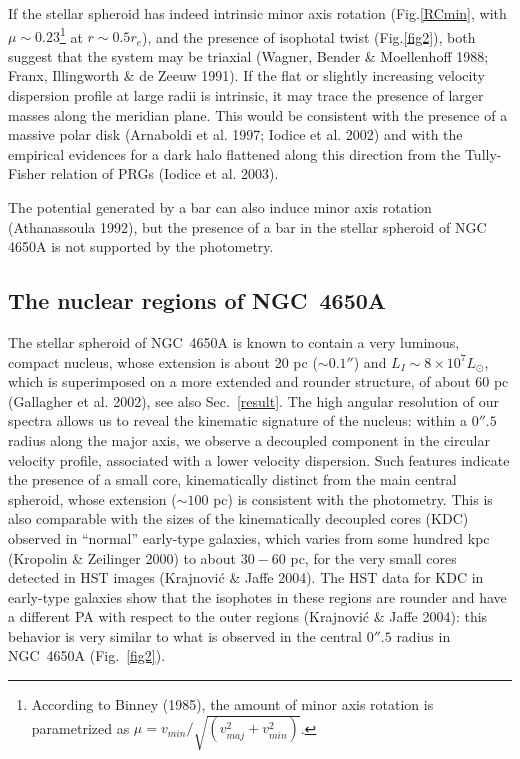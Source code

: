 \documentclass[12pt,preprint]{aastex}
\begin{document}
If the stellar spheroid has indeed intrinsic minor axis rotation
(Fig.\ref{RCmin}, with $\mu \sim 0.23$\footnote{According to Binney
(1985), the amount of minor axis rotation is parametrized as $\mu =
v_{min}/\sqrt{(v_{maj}^{2} +v_{min}^{2})}$.} at $r\sim 0.5 r_e$), and
the presence of isophotal twist (Fig.\ref{fig2}), both suggest that
the system may be triaxial (Wagner, Bender \& Moellenhoff 1988; Franx,
Illingworth \& de Zeeuw 1991). If the flat or slightly increasing
velocity dispersion profile at large radii is intrinsic, it may trace
the presence of larger masses along the meridian plane.  This would be
consistent with the presence of a massive polar disk (Arnaboldi et
al. 1997; Iodice et al. 2002) and with the empirical evidences for a
dark halo flattened along this direction from the Tully-Fisher
relation of PRGs (Iodice et al. 2003).

The potential generated by a bar can also induce minor axis rotation
(Athanassoula 1992), but the presence of a bar in the stellar spheroid
of NGC 4650A is not supported by the photometry.

\subsection{The nuclear regions of NGC~4650A}\label{nuc}

The stellar spheroid of NGC~4650A is known to contain a very luminous,
compact nucleus, whose extension is about 20 pc ($\sim 0.1''$) and
$L_I \sim 8 \times 10^7 L_{\odot}$, which is superimposed on a more
extended and rounder structure, of about 60 pc (Gallagher et
al. 2002), see also Sec.~\ref{result}.
The high angular resolution of our spectra allows us to reveal the
kinematic signature of the nucleus: within a $0''.5$ radius along the
major axis, we observe a decoupled component in the circular velocity
profile, associated with a lower velocity dispersion.  Such features
indicate the presence of a small core, kinematically distinct from the
main central spheroid, whose extension ($\sim 100$ pc) is consistent
with the photometry. This is also comparable with the sizes of the
kinematically decoupled cores (KDC) observed in ``normal'' early-type
galaxies, which varies from some hundred kpc (Kropolin \& Zeilinger
2000) to about $30 - 60$ pc, for the very small cores detected in
HST images (Krajnovi\'{c} \& Jaffe 2004). The HST data for KDC in
early-type galaxies show that the isophotes in these regions are
rounder and have a different PA with respect to the outer regions
(Krajnovi\'{c} \& Jaffe 2004): this behavior is very similar to what is
observed in the central $0''.5$ radius in NGC~4650A (Fig.~\ref{fig2}).
\end{document}
